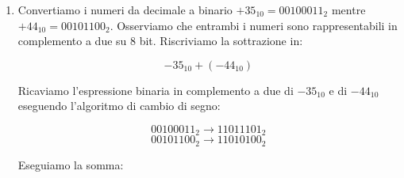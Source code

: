 \documentclass{article}
\begin{document}
\begin{enumerate}
Eseguiamo la somma:

\begin{center}
\end{center}

Il segno dei due addendi \`e discorde non possiamo avere overflow. In alternativa possiamo applicare la regola dei riporti (ultimi due pi\`u significativi), che in questo caso sono concordi, ossia non vi \`e overflow. Per verificare la correttezza del risultato convertiamolo in decimale (ci aspettiamo $110_{10} -120_{10} = -10_{10}$).

$$-2^{7}+2^{6}+2^{5}+2^{4}+2^{2}+2^{1} = -128+64+32+16+4+2 = -128 +118 = -10_{10}$$

\item Convertiamo i numeri da decimale a binario $+35_{10}=00100011_{2}$ mentre $+44_{10}=00101100_{2}$. Osserviamo che entrambi i numeri sono rappresentabili in complemento a due su 8 bit. Riscriviamo la sottrazione in:

$$-35_{10}+(-44_{10})$$

Ricaviamo l'espressione binaria in complemento a due di $-35_{10}$ e di $-44_{10}$ eseguendo l'algoritmo di cambio di segno:

$$ 00100011_{2} \rightarrow 11011101_{2}$$
$$ 00101100_{2} \rightarrow 11010100_{2}$$

Eseguiamo la somma:


\end{enumerate}
\end{document}
